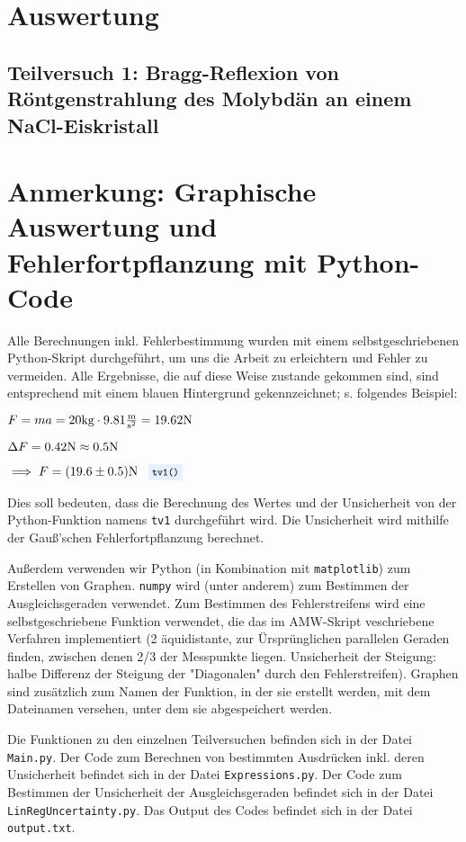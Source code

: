 \documentclass{article}
\newcommand{\coderef}[1]{
    \text{
        \enspace
        \footnotesize
        \colorbox{codebg}{\texttt{#1()}}
    }
}
\begin{document}
\newpage

\section{Auswertung}

    \subsection{Teilversuch 1: Bragg-Reflexion von Röntgenstrahlung des Molybdän an einem NaCl-Eiskristall}

    \newpage

\section{Anmerkung: Graphische Auswertung und Fehlerfortpflanzung mit Python-Code}

Alle Berechnungen inkl. Fehlerbestimmung wurden mit einem selbstgeschriebenen
Python-Skript durchgeführt, um uns die Arbeit zu erleichtern und Fehler zu
vermeiden. Alle Ergebnisse, die auf diese Weise zustande gekommen sind,
sind entsprechend mit einem \colorbox{codebg}{blauen Hintergrund} gekennzeichnet;
s. folgendes Beispiel:

$F = m a = 20 \text{kg} \cdot 9.81 \frac{\text m}{\text s^2} = 19.62 \text N$

$\Delta F = 0.42 \text N \approx 0.5 \text N$

$\implies F = (19.6 \pm 0.5) \text N \coderef{tv1}$

Dies soll bedeuten, dass die Berechnung des Wertes und der Unsicherheit von der
Python-Funktion namens \verb|tv1| durchgeführt wird.
Die Unsicherheit wird mithilfe der Gauß'schen Fehlerfortpflanzung berechnet.

Außerdem verwenden wir Python (in Kombination mit \texttt{matplotlib})
zum Erstellen von Graphen. \texttt{numpy} wird (unter anderem) zum Bestimmen der
Ausgleichsgeraden verwendet. Zum Bestimmen des Fehlerstreifens wird eine
selbstgeschriebene Funktion verwendet, die das im AMW-Skript veschriebene Verfahren
implementiert (2 äquidistante, zur Ürsprünglichen parallelen Geraden finden,
zwischen denen 2/3 der Messpunkte liegen. Unsicherheit der Steigung:
halbe Differenz der Steigung der "Diagonalen" durch den Fehlerstreifen).
Graphen sind zusätzlich zum Namen der Funktion, in der sie erstellt werden,
mit dem Dateinamen versehen, unter dem sie abgespeichert werden.

Die Funktionen zu den einzelnen Teilversuchen befinden sich in der Datei
\verb|Main.py|. Der Code zum Berechnen von bestimmten Ausdrücken
inkl. deren Unsicherheit befindet sich in der Datei \verb|Expressions.py|.
Der Code zum Bestimmen der Unsicherheit der Ausgleichsgeraden
befindet sich in der Datei \\ \verb|LinRegUncertainty.py|.
Das Output des Codes befindet sich in der Datei \verb|output.txt|.
\end{document}
